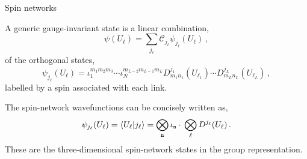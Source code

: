 \documentclass[12pt,titlepage]{article}
\begin{document}
\begin{frame}{Spin networks}
    \begin{list}{\,}{\leftmargin=1em \itemindent=0em}
        \item<1-> A generic gauge-invariant state is a linear combination,
        \begin{equation}
            \psi(U_\ell)=\sum_{j_\ell}\mathcal{C}_{j_\ell}\psi_{j_\ell}(U_\ell)\,,
        \end{equation}
        of the orthogonal states,
        \begin{equation}
            \psi_{j_\ell}(U_\ell)=\iota^{m_1m_2m_3}_1\cdots\iota^{m_{L-2}m_{L-1}m_L}_N D^{j_1}_{m_1n_1}(U_{\ell_1})\cdots D^{j_L}_{m_Ln_L}(U_{\ell_L})\,,
        \end{equation}
        labelled by a spin associated with each link.
        \item<2-> The spin-network wavefunctions can be concisely written as,
        \begin{equation}
            \psi_{j_\ell}(U_\ell)=\braket{U_\ell}{j_\ell}=\bigotimes_\mathtt{n}\iota_\mathtt{n}\cdot\,\bigotimes_\ell D^{j_\ell}(U_\ell)\,.
        \end{equation}
        These are the three-dimensional spin-network states in the group representation.
    \end{list}
\end{frame}

\end{document}
